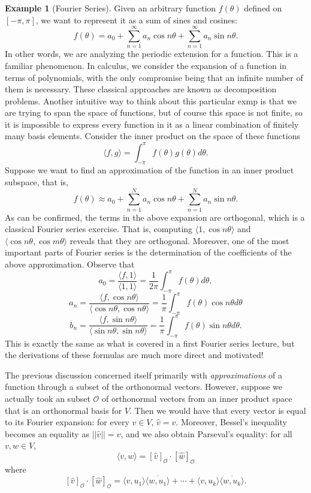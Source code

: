 \documentclass{article}
\theoremstyle{definition}
\newtheorem{exmp}[thm]{Example}
\theoremstyle{remark}
\numberwithin{equation}{section}
\begin{document}
\begin{exmp}[Fourier Series]
Given an arbitrary function $f(\theta)$ defined on $[-\pi, \pi ]$, we want to represent it as a sum of sines and cosines: 
$$f(\theta) = a_0 + \sum _{n = 1} ^ \infty a_n \cos n \theta  +\sum _{n = 1} ^ \infty a_n \sin n \theta .$$
In other words, we are analyzing the periodic extension for a function. This is a familiar phenomenon. In calculus, we consider the expansion of a function in terms of polynomials, with the only compromise being that an infinite number of them is necessary. These classical approaches are known as decomposition problems. Another intuitive way to think about this particular exmp is that we are trying to span the space of functions, but of course this space is not finite, so it is impossible to express every function in it as a linear combination of finitely many basis elements. Consider the inner product on the space of these functions 
$$\langle f, g \rangle = \int _{- \pi} ^\pi f(\theta) g(\theta) d \theta . $$
Suppose we want to find an approximation of the function in an inner product subspace, that is, 
$$f(\theta) \approx a_0 + \sum _{n = 1} ^N a_n \cos n \theta  +\sum _{n = 1} ^ N a_n \sin n \theta .$$
As can be confirmed, the terms in the above expansion are orthogonal, which is a classical Fourier series exercise. That is, computing $\langle 1, \cos n \theta \rangle$ and $\langle \cos n \theta, \cos m \theta \rangle$ reveals that they are orthogonal. Moreover, one of the most important parts of Fourier series is the determination of the coefficients of the above approximation. Observe that 
$$a_0 = \frac{\langle f, 1 \rangle}{\langle 1, 1 \rangle} = \frac{1}{2\pi} \int _{-\pi} ^\pi f(\theta) d\theta,$$
$$a_n = \frac{\langle f, \cos n \theta \rangle}{\langle \cos n \theta, \cos n \theta \rangle} = \frac{1}{\pi} \int _{-\pi} ^\pi f(\theta) \cos n \theta d \theta $$
$$b_n = \frac{\langle f, \sin n \theta \rangle}{\langle \sin n \theta, \sin n \theta \rangle} = \frac{1}{\pi} \int _{-\pi} ^\pi f(\theta) \sin n \theta d \theta.$$
This is exactly the same as what is covered in a first Fourier series lecture, but the derivations of these formulas are much more direct and motivated! 
\end{exmp}

The previous discussion concerned itself primarily with \textit{approximations} of a function through a subset of the orthonormal vectors. However, suppose we actually took an subset $\mathcal{O}$ of orthonormal vectors from an inner product space that is an orthonormal basis for $V$. Then we would have that every vector is equal to its Fourier expansion: for every $v \in V$, $\hat{v} = v$. Moreover, Bessel's inequality becomes an equality as $|| \hat{v} || = v$, and we also obtain Parseval's equality: for all $v, w \in V$, 
$$\langle v, w \rangle = [\hat{v} ]_{\mathcal{O}} \cdot [\hat{w}] _{\mathcal{O}} $$
where 
$$[\hat{v} ]_{\mathcal{O}} \cdot [\hat{w}] _{\mathcal{O}} = \langle v, u_1 \rangle \overline{\langle w, u_1 \rangle} + \cdots + \langle v, u_k \rangle \overline{\langle w, u_k \rangle}.$$
\end{document}
